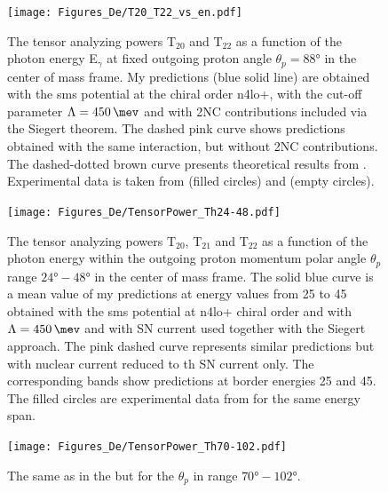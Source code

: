     \begin{figure}[h]
        \begin{center}
        \texttt{[image: Figures\_De/T20\_T22\_vs\_en.pdf]}
        \end{center}
        \caption{The tensor analyzing powers T$_{20}$ and T$_{22}$ as a function of the photon energy E$_\gamma$
        at fixed outgoing proton angle $\theta_p = \ang{88}$ in the center of mass frame.
        My predictions (blue solid line) are obtained with the \gls{sms} potential at the chiral order \gls{n4lo+},
        with the cut-off parameter $\Lambda = \SI{450}{\mev}$ and with 2NC contributions included via the Siegert theorem.
        The dashed pink curve shows predictions obtained with the same interaction, but without 2NC contributions.
        The dashed-dotted brown curve presents theoretical results from \cite{Schmitt1989}.
        Experimental data is taken from \cite{rachek2007} (filled circles)
        and \cite{mishev1993} (empty circles).}
        \label{T20_vs_en}
    \end{figure}

    \begin{figure}[h]
        \begin{center}
        \texttt{[image: Figures\_De/TensorPower\_Th24-48.pdf]}
        \end{center}
        \caption{The tensor analyzing powers T$_{20}$, T$_{21}$ and T$_{22}$ as a function of the
        photon energy within the outgoing proton momentum polar angle $\theta_p$ range $\ang{24} - \ang{48}$
        in the center of mass frame.
        The solid blue curve is a mean value of my predictions at energy values from 25 to \SI{45}{\mev} obtained with
        the \gls{sms} potential at \gls{n4lo+} chiral order and with $\Lambda=\SI{450}{\mev}$
        and with SN current used together with the Siegert approach. 
        The pink dashed curve represents similar predictions but with
        nuclear current reduced to th SN current only. 
        The corresponding bands show predictions at border energies 25 and \SI{45}{\mev}.
        The filled circles are experimental data
        from \cite{rachek2007} for the same energy span.}
        \label{tensor_energy_24-48}
    \end{figure}

    \begin{figure}[h]
        \begin{center}
        \texttt{[image: Figures\_De/TensorPower\_Th70-102.pdf]}
        \end{center}
        \caption{The same as in the  but
        for the $\theta_p$ in range $\ang{70} - \ang{102}$.}
        \label{tensor_energy_70-102}
    \end{figure}
    
